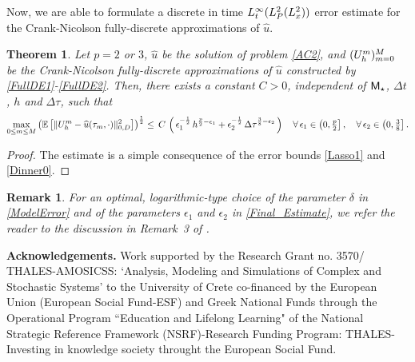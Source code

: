 \documentclass[10pt]{amsart}
\newtheorem{theorem}{Theorem}[section]
\newtheorem{remark}[remm]{Remark}
\numberwithin{equation}{section}
\begin{document}
Now, we are able to formulate a discrete in time $L^{\infty}_t(L^2_{{\scriptscriptstyle} P}(L^2_x))$
error estimate for the Crank-Nicolson fully-discrete approximations of ${\widehat u}$.
\begin{theorem}\label{FFQEWR}
Let $p=2$ or $3$, ${\widehat u}$ be the solution of problem \eqref{AC2},
and $(U_h^m)_{m=0}^{{\scriptscriptstyle} M}$ be the Crank-Nicolson
fully-discrete approximations of ${\widehat u}$ constructed by
\eqref{FullDE1}-\eqref{FullDE2}. Then, there exists a constant
$C>0$, independent of  ${\sf M}_{\star}$, ${\Delta t}$, $h$ and ${\Delta\tau}$,
such that
\begin{equation}\label{Final_Estimate}
\max_{0\leq{m}\leq{{\scriptscriptstyle} M}}\left({\mathbb E}\left[
 \|U_h^m-{\widehat u}(\tau_m,\cdot)\|_{{\scriptscriptstyle} 0,D}^2\right]
\right)^{\frac{1}{2}} \leq\,C\,\left(\,
\epsilon_1^{-\frac{1}{2}}\,h^{\frac{p}{2}-\epsilon_1}
+\epsilon_2^{-\frac{1}{2}}\,{\Delta\tau}^{\frac{3}{8}-\epsilon_2}\,\right)
\quad\forall\,\epsilon_1\in\left(0,\tfrac{p}{2}\right],
\quad\forall\,\epsilon_2\in\left(0,\tfrac{3}{8}\right].
\end{equation}
\end{theorem}
\begin{proof}
The estimate is a simple consequence of the error bounds
\eqref{Lasso1} and \eqref{Dinner0}.
\end{proof}
\begin{remark}
For an optimal, logarithmic-type choice of the parameter $\delta$ in \eqref{ModelError} and of
the parameters $\epsilon_1$ and $\epsilon_2$ in \eqref{Final_Estimate}, we refer the reader to
the discussion in Remark~3 of \cite{KZ2013a}. 
\end{remark}
\par\medskip
\par\noindent
{\bf Acknowledgements.}
Work supported by the Research Grant no. 3570/
THALES-AMOSICSS: `Analysis, Modeling and Simulations of Complex and
Stochastic Systems' to the University of Crete co-financed by the European Union
(European Social Fund-ESF) and Greek National Funds through the Operational
Program ``Education and Lifelong Learning" of the National Strategic Reference
Framework (NSRF)-Research Funding Program: THALES-Investing in knowledge
society throught the European Social Fund.
\end{document}
